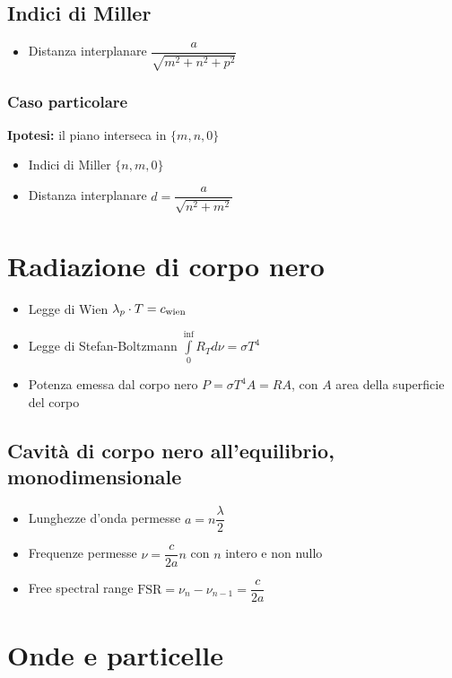 \documentclass[9pt]{extarticle}
\begin{document}
\subsection{Indici di Miller}
\begin{itemize}
  \item Distanza interplanare \( \displaystyle \dfrac{a}{\sqrt{m ^ 2 + n ^ 2 + p ^ 2}} \)
\end{itemize}

\subsubsection{Caso particolare}
\textbf{Ipotesi:} il piano interseca in \( \{m, n, 0\} \)
\begin{itemize}
  \item Indici di Miller \( \{n, m, 0\} \)
  \item Distanza interplanare \( d = \dfrac{a}{\sqrt{n^2+m^2}} \)
\end{itemize}

\section{Radiazione di corpo nero}
\begin{itemize}
  \item Legge di Wien \( \lambda_{p} \cdot T = c_{\textnormal{wien}} \)
  \item Legge di Stefan-Boltzmann \( \displaystyle \int\limits_{0}^{\inf} R_T d \nu = \sigma T ^ 4 \)
  \item Potenza emessa dal corpo nero \( P = \sigma T^4 A = R A \), con \(A\) area della superficie del corpo
\end{itemize}
\subsection{Cavità di corpo nero all'equilibrio, monodimensionale}
\begin{itemize}
  \item Lunghezze d'onda permesse \( a = n \dfrac{\lambda}{2} \)
  \item Frequenze permesse \( \nu = \dfrac{c}{2a} n \) con \( n \) intero e non nullo
  \item Free spectral range \( \text{FSR} = \nu_n - \nu_{n-1} = \dfrac{c}{2a} \)
\end{itemize}

\newpage

\section{Onde e particelle}
\end{document}
